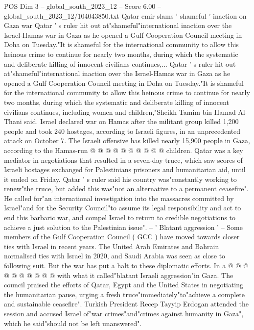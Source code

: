 \begin{textsample}{POS Dim 3 – global\_south\_2023\_12 – Score 6.00 – global\_south\_2023\_12/104043850.txt}  \label{ex:f3_pos_426}
Qatar emir slams ' shameful ' inaction on Gaza war Qatar ' s ruler hit out at"shameful"international inaction over the Israel-Hamas war in Gaza as he opened a Gulf Cooperation Council meeting in Doha on Tuesday."It is shameful for the international community to allow this heinous crime to continue for nearly two months, during which the systematic and deliberate killing of innocent civilians continues,...
Qatar ' s ruler hit out at"shameful"international inaction over the Israel-Hamas war in Gaza as he opened a Gulf Cooperation Council meeting in Doha on Tuesday."It is shameful for the international community to allow this heinous crime to continue for nearly two months, during which the systematic and deliberate killing of innocent civilians continues, including women and children,"Sheikh Tamim bin Hamad Al-Thani said.
Israel declared war on Hamas after the militant group killed 1,200 people and took 240 hostages, according to Israeli figures, in an unprecedented attack on October 7.
The Israeli offensive has killed nearly 15,900 people in Gaza, according to the Hamas-run @ @ @ @ @ @ @ @ @ @ children.
Qatar was a key mediator in negotiations that resulted in a seven-day truce, which saw scores of Israeli hostages exchanged for Palestinians prisoners and humanitarian aid, until it ended on Friday.
Qatar ' s ruler said his country was"constantly working to renew"the truce, but added this was"not an alternative to a permanent ceasefire".
He called for"an international investigation into the massacres committed by Israel"and for the Security Council"to assume its legal responsibility and act to end this barbaric war, and compel Israel to return to credible negotiations to achieve a just solution to the Palestinian issue". -- ' Blatant aggression ' -- Some members of the Gulf Cooperation Council ( GCC ) have moved towards closer ties with Israel in recent years.
The United Arab Emirates and Bahrain normalised ties with Israel in 2020, and Saudi Arabia was seen as close to following suit.
But the war has put a halt to these diplomatic efforts.
In a @ @ @ @ @ @ @ @ @ @ with what it called"blatant Israeli aggression"in Gaza.
The council praised the efforts of Qatar, Egypt and the United States in negotiating the humanitarian pause, urging a fresh truce"immediately"to"achieve a complete and sustainable ceasefire".
Turkish President Recep Tayyip Erdogan attended the session and accused Israel of"war crimes"and"crimes against humanity in Gaza", which he said"should not be left unanswered".

\end{textsample}
